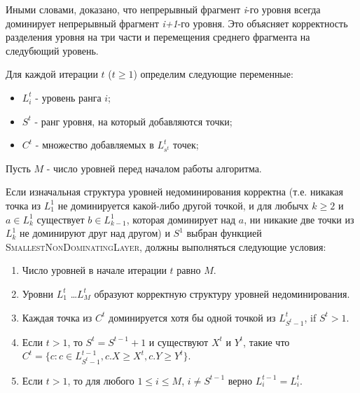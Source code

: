 Иными словами, доказано, что непрерывный фрагмент \textit{i}-го уровня всегда доминирует непрерывный
фрагмент \textit{i+1}-го уровня. Это объясняет корректность разделения уровня на три части и перемещения
среднего фрагмента на следубющий уровень.

\begin{theorem}\label{insert-iteration}
Для каждой итерации $t$ ($t \ge 1$) определим следующие переменные:
\begin{itemize}
	\item $L_i^t$ - уровень ранга $i$;
	\item $S^t$ - ранг уровня, на который добавляются точки;
	\item $C^t$ - множество добавляемых в $L_{s^t}^t$ точек;
\end{itemize}
Пусть $M$ - число уровней перед началом работы алгоритма.

Если изначальная структура уровней недоминирования корректна (т.е. никакая точка из $L_1^1$ 
не доминируется какой-либо другой точкой, и для любычх $k \ge 2$ и $a \in L_k^1$ существует 
$b \in L_{k-1}^1$, которая доминирует над $a$, ни никакие две точки из $L_k^1$ не доминируют 
друг над другом) и $S^1$ выбран функцией \textsc{SmallestNonDominatingLayer}, должны выполняться
следующие условия:
\begin{enumerate}
    \item Число уровней в начале итерации $t$ равно $M$.
    \item Уровни $L_1^t$ \ldots $L_M^t$ образуют корректную структуру уровней недоминирования.
    \item Каждая точка из $C^t$ доминируется хотя бы одной точкой из $L_{S^t - 1}^t$, if $S^t > 1$.
    \item Если $t > 1$, то $S^t = S^{t - 1} + 1$ и существуют $X^t$ и $Y^t$, такие что 
          $C^t = \{c : c \in L_{S^t - 1}^{t - 1}, c.X \ge X^t, c.Y \ge Y^t \}$.
    \item Если $t > 1$, то для любого $1 \le i \le M$, $i \neq S^{t-1}$ верно $L_i^{t-1} = L_i^t$.
\end{enumerate}
\end{theorem}
